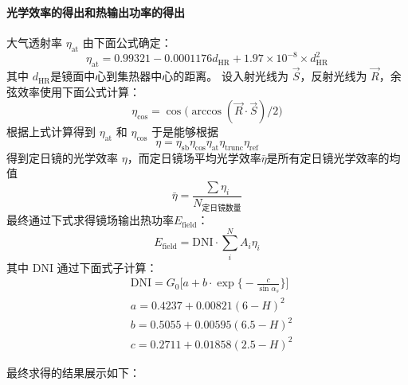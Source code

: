 \documentclass[../main.tex]{subfiles}
\begin{document}
\paragraph{光学效率的得出和热输出功率的得出}
大气透射率 \(\eta _{\mathrm{at}}\) 由下面公式确定：
\begin{equation}
\eta _{\mathrm{at}} = 0.99321 - 0.0001176 d _{\mathrm{HR}} + 1.97 \times 10 ^{-8} \times d _{\mathrm{HR}} ^{2}
\end{equation}
其中 \(d _{\mathrm{HR}}\)是镜面中心到集热器中心的距离。
设入射光线为 \(\vec S\)，反射光线为 \(\vec R\)，余弦效率使用下面公式计算：
\begin{equation}
\eta _{\cos} = \cos \big(\arccos (\vec R \cdot \vec S) / 2\big)
\end{equation}
根据上式计算得到 \(\eta _{\mathrm{at}}\) 和 \(\eta _{\cos}\)
于是能够根据
\begin{equation}
\eta = \eta _{\mathrm{s b}} \eta _{\cos} \eta _{\mathrm{at}} \eta _{\mathrm{trunc}} \eta _{\mathrm{ref}}
\end{equation}
得到定日镜的光学效率 \(\eta\)，而定日镜场平均光学效率\(\bar \eta\)是所有定日镜光学效率的均值
\begin{equation}
\bar \eta = \frac{\sum \eta_{i}}{N_{\text{定日镜数量}}}
\end{equation}
最终通过下式求得镜场输出热功率\(E_{\mathrm{field}}\)：
\begin{equation}
E_{\mathrm{field}} = \mathrm{DNI} \cdot \sum _{i} ^{N} A_{i} \eta _{i}
\end{equation}
其中 \(\mathrm{DNI}\) 通过下面式子计算：
\begin{equation}
\begin{aligned}
& \mathrm{DNI} = G_{0} \bigg[ a + b \cdot \exp\Big\{{-}\frac{c}{\sin \alpha_{s}}\Big\}\bigg]\\
& a = 0.4237 + 0.00821 (6 - H) ^{2} \\
& b = 0.5055 + 0.00595(6.5 - H) ^{2} \\
& c = 0.2711 + 0.01858 (2.5 - H) ^{2}
\end{aligned}
\end{equation}

最终求得的结果展示如下：
\end{document}
